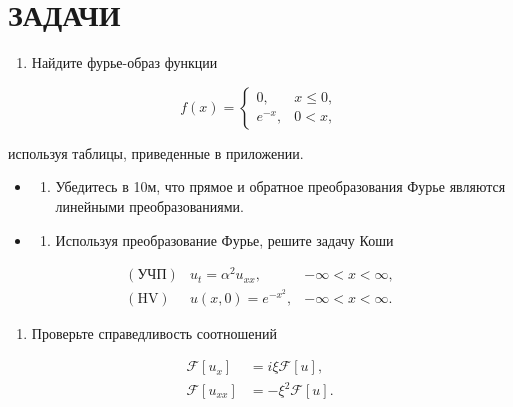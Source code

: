 \documentclass[
  ukrainian,
]{article}
\providecommand{\tightlist}{%
  \setlength{\itemsep}{0pt}\setlength{\parskip}{0pt}}
\begin{document}
\section{ЗАДАЧИ}\label{ux437ux430ux434ux430ux447ux438-1}

\begin{enumerate}
\def\labelenumi{\arabic{enumi}.}
\tightlist
\item
  Найдите фурье-образ функции
\end{enumerate}

\[
f(x) =
\begin{cases} 0, & x \leq 0, \\ e^{-x}, & 0 < x, \end{cases}
\]

используя таблицы, приведенные в приложении.

\begin{itemize}
\tightlist
\item
  \begin{enumerate}
  \def\labelenumi{\arabic{enumi}.}
  \setcounter{enumi}{1}
  \tightlist
  \item
    Убедитесь в 10м, что прямое и обратное преобразования Фурье являются
    линейными преобразованиями.
  \end{enumerate}
\item
  \begin{enumerate}
  \def\labelenumi{\arabic{enumi}.}
  \setcounter{enumi}{2}
  \tightlist
  \item
    Используя преобразование Фурье, решите задачу Коши
  \end{enumerate}
\end{itemize}

\[
\begin{array}{lll} (\text{УЧП}) & u_t = \alpha^2 u_{xx}, & -\infty < x < \infty, \\ (\text{HV}) & u(x, 0) = e^{-x^2}, & -\infty < x < \infty. \end{array}
\]

\begin{enumerate}
\def\labelenumi{\arabic{enumi}.}
\setcounter{enumi}{3}
\tightlist
\item
  Проверьте справедливость соотношений
\end{enumerate}

\[
\begin{aligned} \mathcal{F}\left[u_{x}\right] &= i\xi \mathcal{F}\left[u\right], \\ \mathcal{F}\left[u_{xx}\right] &= -\xi^{2} \mathcal{F}\left[u\right]. \end{aligned}
\]
\end{document}
